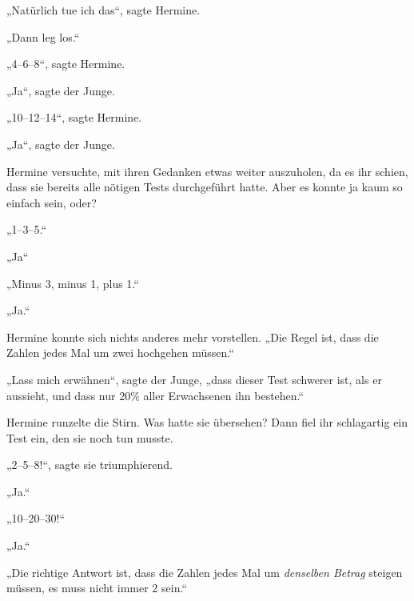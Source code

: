 „Natürlich tue ich das“, sagte Hermine.

„Dann leg los.“

„4–6–8“, sagte Hermine.

„Ja“, sagte der Junge.

„10–12–14“, sagte Hermine.

„Ja“, sagte der Junge.

Hermine versuchte, mit ihren Gedanken etwas weiter auszuholen, da es ihr schien, dass sie bereits alle nötigen Tests durchgeführt hatte. Aber es konnte ja kaum so einfach sein, oder?

„1–3–5.“

„Ja“

„Minus 3, minus 1, plus 1.“

„Ja.“

Hermine konnte sich nichts anderes mehr vorstellen. „Die Regel ist, dass die Zahlen jedes Mal um zwei hochgehen müssen.“

„Lass mich erwähnen“, sagte der Junge, „dass dieser Test schwerer ist, als er aussieht, und dass nur 20\% aller Erwachsenen ihn bestehen.“

Hermine runzelte die Stirn. Was hatte sie übersehen? Dann fiel ihr schlagartig ein Test ein, den sie noch tun musste.

„2–5–8!“, sagte sie triumphierend.

„Ja.“

„10–20–30!“

„Ja.“

„Die richtige Antwort ist, dass die Zahlen jedes Mal um \emph{denselben Betrag} steigen müssen, es muss nicht immer 2 sein.“

